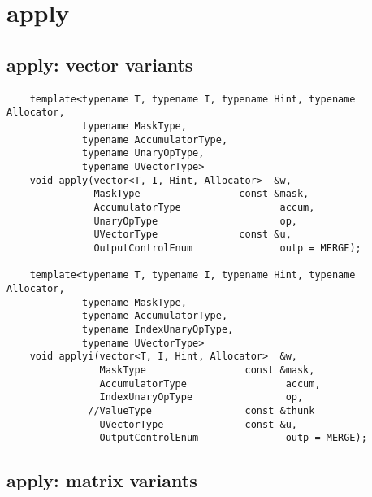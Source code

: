\section{{\sf apply}}


\subsection{{\sf apply}: vector variants}

\paragraph{\syntax}

\begin{verbatim}
    template<typename T, typename I, typename Hint, typename Allocator,
             typename MaskType,
             typename AccumulatorType,
             typename UnaryOpType,
             typename UVectorType>
    void apply(vector<T, I, Hint, Allocator>  &w,
               MaskType                 const &mask,
               AccumulatorType                 accum,
               UnaryOpType                     op,
               UVectorType              const &u,
               OutputControlEnum               outp = MERGE);

    template<typename T, typename I, typename Hint, typename Allocator,
             typename MaskType,
             typename AccumulatorType,
             typename IndexUnaryOpType,
             typename UVectorType>
    void applyi(vector<T, I, Hint, Allocator>  &w,
                MaskType                 const &mask,
                AccumulatorType                 accum,
                IndexUnaryOpType                op,
              //ValueType                const &thunk
                UVectorType              const &u,
                OutputControlEnum               outp = MERGE);

\end{verbatim}

\subsection{{\sf apply}: matrix variants}


